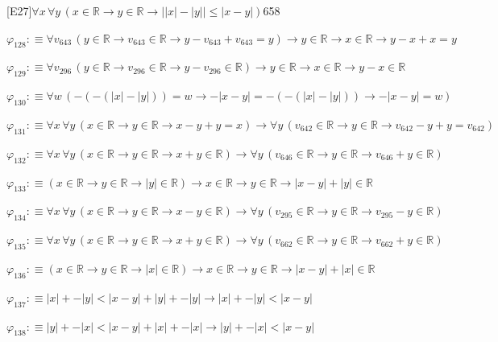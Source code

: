 \begin{fullproof}{[E27]}{$\forall x\,\forall y\,(x \in \mathbb{R} \to y \in \mathbb{R} \to \lvert \lvert x \rvert - \lvert y \rvert \rvert \leq \lvert x - y \rvert)$}{658}
\begin{abbrevlist}
\item $\varphi_{128} :\equiv \forall v_{643}\,(y \in \mathbb{R} \to v_{643} \in \mathbb{R} \to y - v_{643} + v_{643} = y) \to y \in \mathbb{R} \to x \in \mathbb{R} \to y - x + x = y$
\item $\varphi_{129} :\equiv \forall v_{296}\,(y \in \mathbb{R} \to v_{296} \in \mathbb{R} \to y - v_{296} \in \mathbb{R}) \to y \in \mathbb{R} \to x \in \mathbb{R} \to y - x \in \mathbb{R}$
\item $\varphi_{130} :\equiv \forall w\,(-(-(\lvert x \rvert - \lvert y \rvert)) = w \to -\lvert x - y \rvert = -(-(\lvert x \rvert - \lvert y \rvert)) \to -\lvert x - y \rvert = w)$
\item $\varphi_{131} :\equiv \forall x\,\forall y\,(x \in \mathbb{R} \to y \in \mathbb{R} \to x - y + y = x) \to \forall y\,(v_{642} \in \mathbb{R} \to y \in \mathbb{R} \to v_{642} - y + y = v_{642})$
\item $\varphi_{132} :\equiv \forall x\,\forall y\,(x \in \mathbb{R} \to y \in \mathbb{R} \to x + y \in \mathbb{R}) \to \forall y\,(v_{646} \in \mathbb{R} \to y \in \mathbb{R} \to v_{646} + y \in \mathbb{R})$
\item $\varphi_{133} :\equiv (x \in \mathbb{R} \to y \in \mathbb{R} \to \lvert y \rvert \in \mathbb{R}) \to x \in \mathbb{R} \to y \in \mathbb{R} \to \lvert x - y \rvert + \lvert y \rvert \in \mathbb{R}$
\item $\varphi_{134} :\equiv \forall x\,\forall y\,(x \in \mathbb{R} \to y \in \mathbb{R} \to x - y \in \mathbb{R}) \to \forall y\,(v_{295} \in \mathbb{R} \to y \in \mathbb{R} \to v_{295} - y \in \mathbb{R})$
\item $\varphi_{135} :\equiv \forall x\,\forall y\,(x \in \mathbb{R} \to y \in \mathbb{R} \to x + y \in \mathbb{R}) \to \forall y\,(v_{662} \in \mathbb{R} \to y \in \mathbb{R} \to v_{662} + y \in \mathbb{R})$
\item $\varphi_{136} :\equiv (x \in \mathbb{R} \to y \in \mathbb{R} \to \lvert x \rvert \in \mathbb{R}) \to x \in \mathbb{R} \to y \in \mathbb{R} \to \lvert x - y \rvert + \lvert x \rvert \in \mathbb{R}$
\item $\varphi_{137} :\equiv \lvert x \rvert + -\lvert y \rvert < \lvert x - y \rvert + \lvert y \rvert + -\lvert y \rvert \to \lvert x \rvert + -\lvert y \rvert < \lvert x - y \rvert$
\item $\varphi_{138} :\equiv \lvert y \rvert + -\lvert x \rvert < \lvert x - y \rvert + \lvert x \rvert + -\lvert x \rvert \to \lvert y \rvert + -\lvert x \rvert < \lvert x - y \rvert$

\end{abbrevlist}
\end{fullproof}
